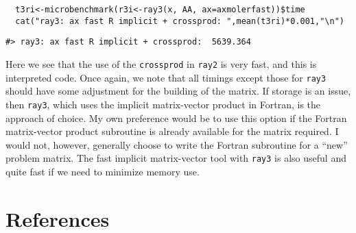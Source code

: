 \begin{verbatim}
  t3ri<-microbenchmark(r3i<-ray3(x, AA, ax=axmolerfast))$time
  cat("ray3: ax fast R implicit + crossprod: ",mean(t3ri)*0.001,"\n")
\end{verbatim}

\begin{verbatim}
#> ray3: ax fast R implicit + crossprod:  5639.364
\end{verbatim}

Here we see that the use of the \texttt{crossprod} in \texttt{ray2} is
very fast, and this is interpreted code. Once again, we note that all
timings except those for \texttt{ray3} should have some adjustment for
the building of the matrix. If storage is an issue, then \texttt{ray3},
which uses the implicit matrix-vector product in Fortran, is the
approach of choice. My own preference would be to use this option
if the Fortran matrix-vector product subroutine is already available
for the matrix required. I would not, however, generally choose to
write the Fortran subroutine for a ``new'' problem matrix. The fast
implicit matrix-vector tool with \texttt{ray3} is also useful and
quite fast if we need to minimize memory use.

\section{References}\label{references}



\address{%
John C. Nash\\
retired professor, University of Ottawa\\%
Telfer School of Management\\ Ottawa ON Canada K1N 6N5\\
%
%
\textit{ORCiD: \href{https://orcid.org/0000-0002-2762-8039}{0000-0002-2762-8039}}\\%
\href{mailto:profjcnash@gmail.com}{\nolinkurl{profjcnash@gmail.com}}%
}

